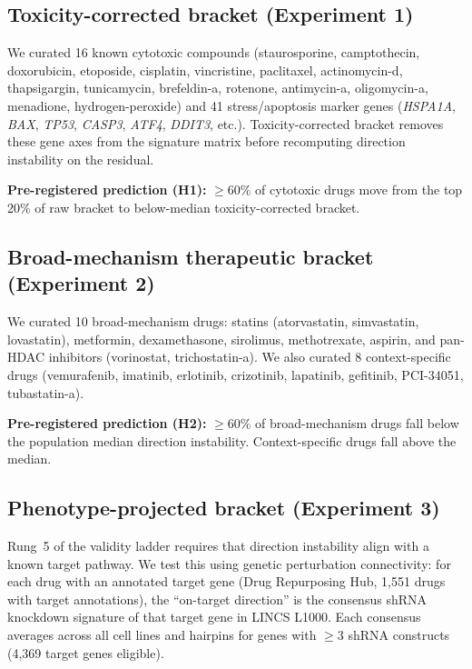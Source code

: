 \documentclass{article}
\begin{document}
\subsection{Toxicity-corrected bracket (Experiment 1)}

We curated 16 known cytotoxic compounds (staurosporine, camptothecin,
doxorubicin, etoposide, cisplatin, vincristine, paclitaxel, actinomycin-d,
thapsigargin, tunicamycin, brefeldin-a, rotenone, antimycin-a, oligomycin-a,
menadione, hydrogen-peroxide) and 41 stress/apoptosis marker genes
(\emph{HSPA1A}, \emph{BAX}, \emph{TP53}, \emph{CASP3}, \emph{ATF4},
\emph{DDIT3}, etc.). Toxicity-corrected bracket removes these gene axes from
the signature matrix before recomputing direction instability on the residual.

\textbf{Pre-registered prediction (H1):} $\geq$60\% of cytotoxic drugs move
from the top 20\% of raw bracket to below-median toxicity-corrected bracket.

\subsection{Broad-mechanism therapeutic bracket (Experiment 2)}

We curated 10 broad-mechanism drugs: statins (atorvastatin, simvastatin,
lovastatin), metformin, dexamethasone, sirolimus, methotrexate, aspirin,
and pan-HDAC inhibitors (vorinostat, trichostatin-a). We also curated 8
context-specific drugs (vemurafenib, imatinib, erlotinib, crizotinib,
lapatinib, gefitinib, PCI-34051, tubastatin-a).

\textbf{Pre-registered prediction (H2):} $\geq$60\% of broad-mechanism drugs
fall below the population median direction instability. Context-specific
drugs fall above the median.

\subsection{Phenotype-projected bracket (Experiment 3)}

Rung~5 of the validity ladder requires that direction instability align with
a known target pathway. We test this using genetic perturbation connectivity:
for each drug with an annotated target gene (Drug Repurposing Hub,
1{,}551 drugs with target annotations), the ``on-target direction'' is the
consensus shRNA knockdown signature of that target gene in LINCS L1000.
Each consensus averages across all cell lines and hairpins for genes with
$\geq$3 shRNA constructs (4{,}369 target genes eligible).
\end{document}
